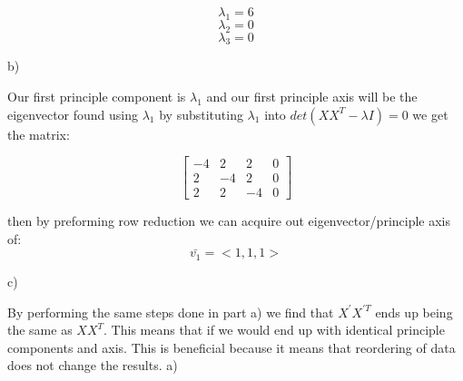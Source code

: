 \documentclass{homework}
\begin{document}
\[
\lambda_{1}=6\]
\[ 
\lambda_{2}=0\]
\[ 
\lambda_{3}=0\]

b)

Our first principle component is \(\lambda_{1}\) and our first principle axis will be the eigenvector found using \(\lambda_{1}\)
\newline
by substituting \(\lambda_{1}\) into \( det(XX^{T}-\lambda I) = 0 \) we get the matrix:

\[
\begin{bmatrix}
-4 & 2 & 2 & 0\\ 
 2& -4 & 2 & 0\\ 
 2& 2 & -4 & 0
\end{bmatrix}
\]

then by preforming row reduction we can acquire out eigenvector/principle axis of:
\[
\bar{v_{1}} = <1,1,1>
\]


c)

By performing the same steps done in part a) we find that \(X^{'}X^{'T}\) ends up being the same as \(XX^{T}\). This means that if we would end up with identical principle components and axis. This is beneficial because it means that reordering of data does not change the results.
\newpage
\exercise*
a)
\end{document}
